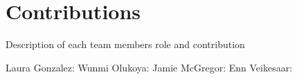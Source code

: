 \documentclass[12pt]{article}
\begin{document}
\onehalfspacing






     

\newpage
\begin{singlespacing}
\tableofcontents
\end{singlespacing}
\setlength{\parskip}{1em}
\renewcommand{\baselinestretch}{2.0}



\newpage 
{}
\setcounter{page}{1}
\onehalfspacing



\section{Contributions}

Description of each team members role and contribution

Laura Gonzalez:
Wunmi Olukoya:
Jamie McGregor: 
Enn Veikesaar:










\end{document}
